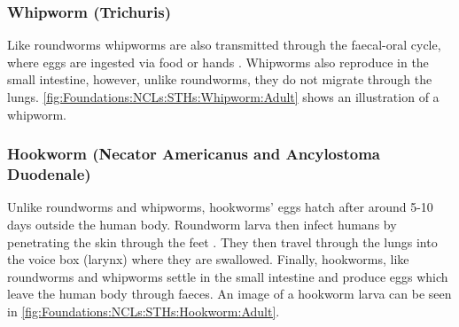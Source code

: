 \subsubsection{Whipworm (Trichuris)}
\label{sec:Foundations:NTDs:STHs:Whipworm}

Like roundworms whipworms are also transmitted through the faecal-oral cycle, where eggs are ingested via food or hands \cite{jourdan2018soiltransmitted}. Whipworms also reproduce in the small intestine, however, unlike roundworms, they do not migrate through the lungs. \autoref{fig:Foundations:NCLs:STHs:Whipworm:Adult} shows an illustration of a whipworm.

\subsubsection{Hookworm (Necator Americanus and Ancylostoma Duodenale)}
\label{sec:Foundations:NTDs:STHs:Hookworm}

Unlike roundworms and whipworms, hookworms' eggs hatch after around 5-10 days outside the human body. Roundworm larva then infect humans by penetrating the skin through the feet \cite{jourdan2018soiltransmitted}. They then travel through the lungs into the voice box (larynx) where they are swallowed. Finally, hookworms, like roundworms and whipworms settle in the small intestine and produce eggs which leave the human body through faeces. An image of a hookworm larva can be seen in \autoref{fig:Foundations:NCLs:STHs:Hookworm:Adult}.

